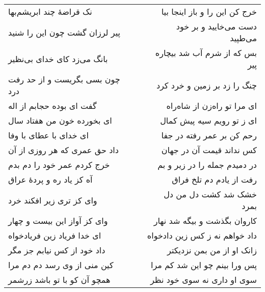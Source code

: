 \begin{center}
\begin{longtable}{l p{0.5cm} r}
\\
نک قراضهٔ چند ابریشم‌بها
&&
خرج کن این را و باز اینجا بیا
\\
پیر لرزان گشت چون این را شنید
&&
دست می‌خایید و بر خود می‌طپید
\\
بانگ می‌زد کای خدای بی‌نظیر
&&
بس که از شرم آب شد بیچاره پیر
\\
چون بسی بگریست و از حد رفت درد
&&
چنگ را زد بر زمین و خرد کرد
\\
گفت ای بوده حجابم از اله
&&
ای مرا تو راه‌زن از شاه‌راه
\\
ای بخورده خون من هفتاد سال
&&
ای ز تو رویم سیه پیش کمال
\\
ای خدای با عطای با وفا
&&
رحم کن بر عمر رفته در جفا
\\
داد حق عمری که هر روزی از آن
&&
کس نداند قیمت آن در جهان
\\
خرج کردم عمر خود را دم بدم
&&
در دمیدم جمله را در زیر و بم
\\
آه کز یاد ره و پردهٔ عراق
&&
رفت از یادم دم تلخ فراق
\\
وای کز تری زیر افکند خرد
&&
خشک شد کشت دل من دل بمرد
\\
وای کز آواز این بیست و چهار
&&
کاروان بگذشت و بیگه شد نهار
\\
ای خدا فریاد زین فریادخواه
&&
داد خواهم نه ز کس زین دادخواه
\\
داد خود از کس نیابم جز مگر
&&
زانک او از من بمن نزدیکتر
\\
کین منی از وی رسد دم دم مرا
&&
پس ورا بینم چو این شد کم مرا
\\
همچو آن کو با تو باشد زرشمر
&&
سوی او داری نه سوی خود نظر
\\
\end{longtable}
\end{center}
